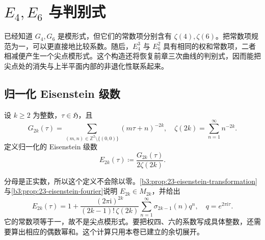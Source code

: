 \section{\texorpdfstring{\(E_4,E_6\)}{E₄, E₆} 与判别式}
\label{b3:sec:2304}

已经知道 \(G_4,G_6\) 是模形式，但它们的常数项分别含有 \(\zeta(4),\zeta(6)\)。把常数项规范为一，可以更直接地比较系数。随后，\(E_4^3\) 与 \(E_6^2\) 具有相同的权和常数项，二者相减便产生一个尖点模形式。这个构造还将恢复前章三次曲线的判别式，因而能把尖点处的消失与上半平面内部的非退化性联系起来。

\subsection{归一化 Eisenstein 级数}
\label{b3:subsec:230401}

\begin{definition}\label{b3:def:23-normalized-eisenstein}
设 \(k\ge2\) 为整数，\(\tau\in\mathfrak H\)，且
\[
 G_{2k}(\tau)=\sum_{(m,n)\in\mathbb Z^2\setminus\{(0,0)\}}(m\tau+n)^{-2k},
 \quad \zeta(2k)=\sum_{n=1}^{\infty}n^{-2k}.
\]
定义归一化的 Eisenstein 级数
\[
 E_{2k}(\tau)\coloneqq\frac{G_{2k}(\tau)}{2\zeta(2k)}.
\]
\end{definition}

分母是正实数，所以这个定义不会除以零。\cref{b3:prop:23-eisenstein-transformation}与\cref{b3:prop:23-eisenstein-fourier}说明 \(E_{2k}\in M_{2k}\)，并给出
\begin{equation}\label{b3:eq:23-normalized-eisenstein-fourier}
 E_{2k}(\tau)=1+
 \frac{(2\pi\mathrm{i})^{2k}}{(2k-1)!\,\zeta(2k)}
 \sum_{n=1}^{\infty}\sigma_{2k-1}(n)q^n,
 \quad q=e^{2\pi\mathrm{i}\tau}.
\end{equation}
它的常数项等于一，故不是尖点模形式。要把权四、六的系数写成具体整数，还需要算出相应的偶数幂和。这个计算只用本卷已建立的余切展开。

